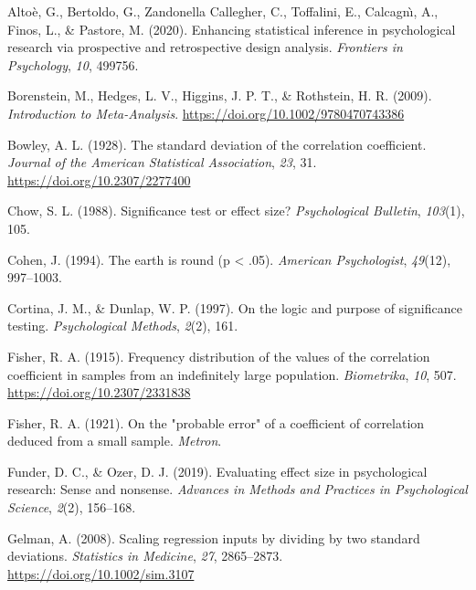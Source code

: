 \documentclass[
  man]{apa7}
\newlength{\cslhangindent}
\newlength{\cslentryspacingunit} %
\newenvironment{CSLReferences}[2] %
 {%
  \setlength{\parindent}{0pt}
  \ifodd #1
  \let\oldpar\par
  \def\par{\hangindent=\cslhangindent\oldpar}
  \fi
  \setlength{\parskip}{#2\cslentryspacingunit}
 }%
 {}
\begin{document}
\hypertarget{refs}{}
\begin{CSLReferences}{1}{0}
\leavevmode{}%
Altoè, G., Bertoldo, G., Zandonella Callegher, C., Toffalini, E., Calcagnı̀, A., Finos, L., \& Pastore, M. (2020). Enhancing statistical inference in psychological research via prospective and retrospective design analysis. \emph{Frontiers in Psychology}, \emph{10}, 499756.

\leavevmode{}%
Borenstein, M., Hedges, L. V., Higgins, J. P. T., \& Rothstein, H. R. (2009). \emph{Introduction to {Meta-Analysis}}. \url{https://doi.org/10.1002/9780470743386}

\leavevmode{}%
Bowley, A. L. (1928). The standard deviation of the correlation coefficient. \emph{Journal of the American Statistical Association}, \emph{23}, 31. \url{https://doi.org/10.2307/2277400}

\leavevmode{}%
Chow, S. L. (1988). Significance test or effect size? \emph{Psychological Bulletin}, \emph{103}(1), 105.

\leavevmode{}%
Cohen, J. (1994). The earth is round (p \textless{} .05). \emph{American Psychologist}, \emph{49}(12), 997--1003.

\leavevmode{}%
Cortina, J. M., \& Dunlap, W. P. (1997). On the logic and purpose of significance testing. \emph{Psychological Methods}, \emph{2}(2), 161.

\leavevmode{}%
Fisher, R. A. (1915). Frequency distribution of the values of the correlation coefficient in samples from an indefinitely large population. \emph{Biometrika}, \emph{10}, 507. \url{https://doi.org/10.2307/2331838}

\leavevmode{}%
Fisher, R. A. (1921). On the "probable error" of a coefficient of correlation deduced from a small sample. \emph{Metron}.

\leavevmode{}%
Funder, D. C., \& Ozer, D. J. (2019). Evaluating effect size in psychological research: Sense and nonsense. \emph{Advances in Methods and Practices in Psychological Science}, \emph{2}(2), 156--168.

\leavevmode{}%
Gelman, A. (2008). Scaling regression inputs by dividing by two standard deviations. \emph{Statistics in Medicine}, \emph{27}, 2865--2873. \url{https://doi.org/10.1002/sim.3107}


\end{CSLReferences}
\end{document}
